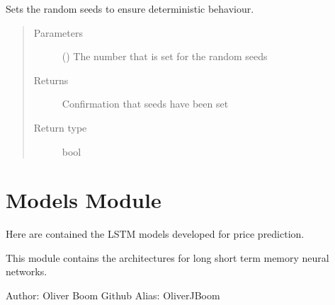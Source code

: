 \documentclass[letterpaper,10pt,english]{sphinxmanual}
\begin{document}

\begin{fulllineitems}
\label{\detokenize{deeplearning:Foresight.deeplearning.set_seed}}
Sets the random seeds to ensure deterministic behaviour.
\begin{quote}\begin{description}
\item[{Parameters}] \leavevmode
{} () \textendash{} The number that is set for the random seeds

\item[{Returns}] \leavevmode
Confirmation that seeds have been set

\item[{Return type}] \leavevmode
bool

\end{description}\end{quote}

\end{fulllineitems}



\section{Models Module}
\label{\detokenize{models:models-module}}\label{\detokenize{models::doc}}
Here are contained the LSTM models developed for price prediction.

\label{\detokenize{models:module-Foresight.models}}
This module contains the architectures for long short term memory
neural networks.

Author: Oliver Boom
Github Alias: OliverJBoom
\end{document}
